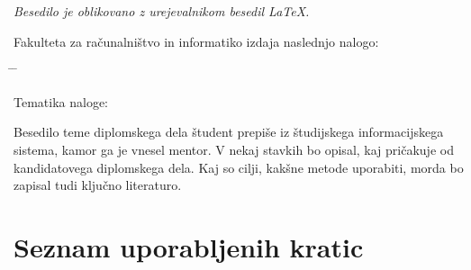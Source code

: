 \documentclass[a4paper, 12pt]{book}
\newcommand{\clearemptydoublepage}{\newpage{\pagestyle{empty}\cleardoublepage}}
\begin{document}
\begin{center}
\mbox{}\vfill
\emph{Besedilo je oblikovano z urejevalnikom besedil \LaTeX.}
\end{center}
\clearemptydoublepage

\thispagestyle{empty}
\vspace*{4cm}

\noindent
Fakulteta za računalništvo in informatiko izdaja naslednjo nalogo:
\medskip
\begin{tabbing}
\hspace{32mm}\= \hspace{6cm} \= \kill




Tematika naloge:
\end{tabbing}
Besedilo teme diplomskega dela študent prepiše iz študijskega informacijskega sistema, kamor ga je vnesel mentor. V nekaj stavkih bo opisal, kaj pričakuje od kandidatovega diplomskega dela. Kaj so cilji, kakšne metode uporabiti, morda bo zapisal tudi ključno literaturo.
\vspace{15mm}






\vspace{2cm}

\clearemptydoublepage






\pagestyle{empty}
\def\thepage{}%
\tableofcontents{}


\clearemptydoublepage


\chapter*{Seznam uporabljenih kratic}  %
\end{document}
